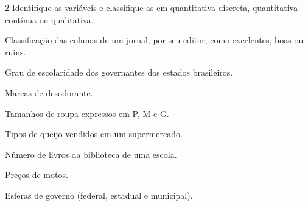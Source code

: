
\num{2} Identifique as variáveis e classifique-as em quantitativa discreta,
quantitativa contínua ou qualitativa.

\begin{escolha}
\item
  Classificação das colunas de um jornal, por seu editor, como
  excelentes, boas ou ruins.


\item
  Grau de escolaridade dos governantes dos estados brasileiros.


\item
  Marcas de desodorante.


\item
  Tamanhos de roupa expressos em P, M e G.


\item
  Tipos de queijo vendidos em um supermercado.


\item
  Número de livros da biblioteca de uma escola.


\item
  Preços de motos.


\item
  Esferas de governo (federal, estadual e municipal).

\end{escolha}


